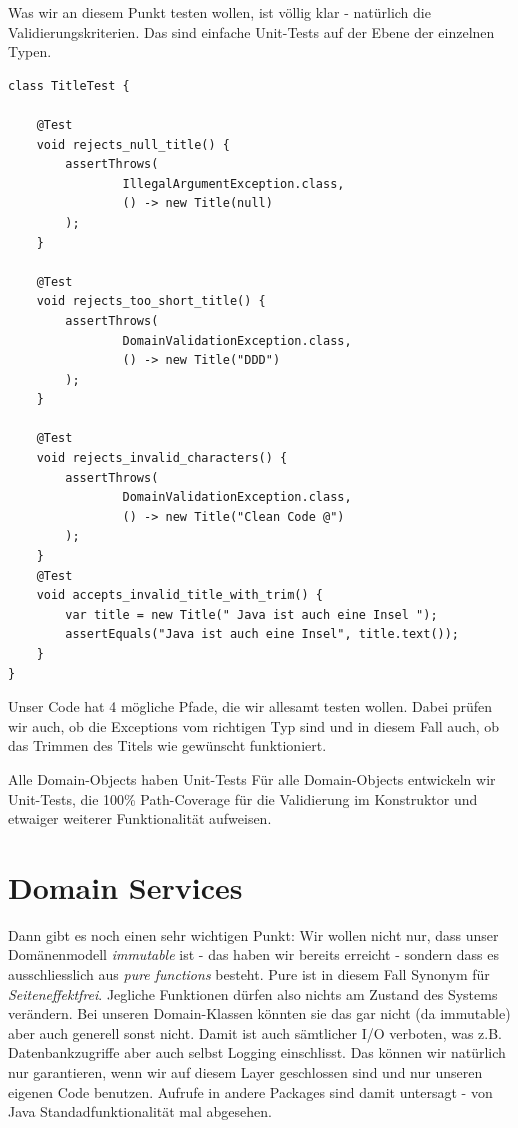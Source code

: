 Was wir an diesem Punkt testen wollen, ist völlig klar - natürlich die
Validierungskriterien. Das sind einfache Unit-Tests auf der Ebene der
einzelnen Typen. 

\begin{listing}[H]
\begin{verbatim}
class TitleTest {

    @Test
    void rejects_null_title() {
        assertThrows(
                IllegalArgumentException.class,
                () -> new Title(null)
        );
    }

    @Test
    void rejects_too_short_title() {
        assertThrows(
                DomainValidationException.class,
                () -> new Title("DDD")
        );
    }

    @Test
    void rejects_invalid_characters() {
        assertThrows(
                DomainValidationException.class,
                () -> new Title("Clean Code @")
        );
    }
    @Test
    void accepts_invalid_title_with_trim() {
        var title = new Title(" Java ist auch eine Insel ");
        assertEquals("Java ist auch eine Insel", title.text());
    }
}
\end{verbatim}
\caption{Unit-Test für die Title-Klasse}
\label{lst:createBookSnipped}
\end{listing}

Unser Code hat 4 mögliche Pfade, die wir allesamt testen wollen. Dabei prüfen
wir auch, ob die Exceptions vom richtigen Typ sind und in diesem Fall auch, ob
das Trimmen des Titels wie gewünscht funktioniert.

\begin{rulebox}[label=rule:domainUnitTests]
    {Alle Domain-Objects haben Unit-Tests}
Für alle Domain-Objects entwickeln wir Unit-Tests, die 100\% Path-Coverage für
die Validierung im Konstruktor und etwaiger weiterer Funktionalität aufweisen.
\end{rulebox}

\section{Domain Services}

Dann gibt es noch einen sehr wichtigen Punkt: Wir wollen nicht nur, dass
unser Domänenmodell \textit{immutable} ist - das haben wir bereits erreicht -
sondern dass es ausschliesslich aus \textit{pure functions} besteht. Pure
ist in diesem Fall Synonym für \textit{Seiteneffektfrei}. Jegliche
Funktionen dürfen also nichts am Zustand des Systems verändern. Bei unseren
Domain-Klassen könnten sie das gar nicht (da immutable) aber auch generell
sonst nicht. Damit ist auch sämtlicher I/O verboten, was z.B. Datenbankzugriffe
aber auch selbst Logging einschlisst. Das können wir natürlich nur garantieren,
wenn wir auf diesem Layer geschlossen sind und nur unseren eigenen Code
benutzen. Aufrufe in andere Packages sind damit untersagt - von Java 
Standadfunktionalität mal abgesehen.

